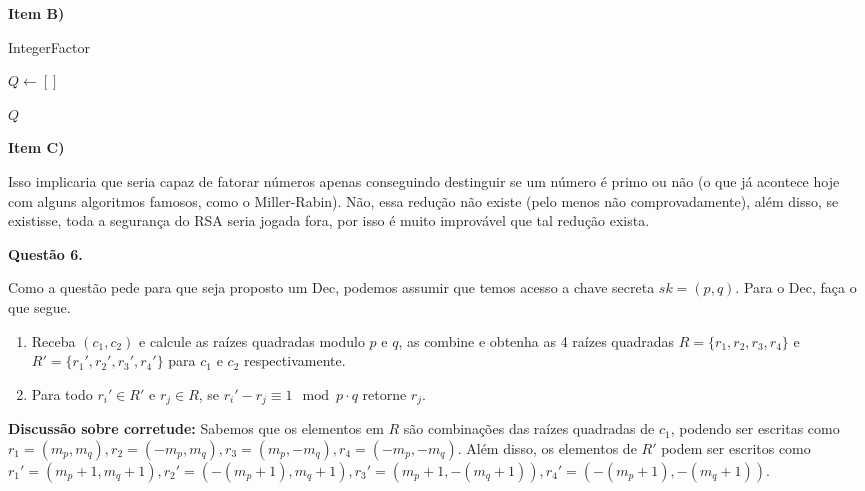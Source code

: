 \documentclass{article}
\begin{document}
\textbf{Item B)}

\begin{algorithm}[H]
\caption{IntegerFactor}

$Q \leftarrow []$

\Return $Q$
\end{algorithm}

\textbf{Item C)}

Isso implicaria que seria capaz de fatorar números apenas conseguindo destinguir se um número é primo ou não (o que já acontece hoje com alguns algoritmos famosos, como o Miller-Rabin). Não, essa redução não existe (pelo menos não comprovadamente), além disso, se existisse, toda a segurança do RSA seria jogada fora, por isso é muito improvável que tal redução exista.

\textbf{Questão 6.}

Como a questão pede para que seja proposto um Dec, podemos assumir que temos acesso a chave secreta $sk =(p,q)$. Para o Dec, faça o que segue.

\begin{enumerate}
        \item Receba $(c_1,c_2)$ e calcule as raízes quadradas modulo $p$ e $q$, as combine e obtenha as 4 raízes quadradas $R = \{r_1, r_2, r_3, r_4\}$ e $R'=\{r_1', r_2', r_3', r_4'\}$ para $c_1$ e $c_2$ respectivamente.
        \item Para todo $r_i' \in R'$ e $r_j \in R$, se $r_i' - r_j \equiv 1 \mod p \cdot q$ retorne $r_j$.
\end{enumerate}

\textbf{Discussão sobre corretude:} Sabemos que os elementos em $R$ são combinações das raízes quadradas de $c_1$, podendo ser escritas como $r_1 = (m_p, m_q), r_2 =(-m_p, m_q), r_3 = (m_p, -m_q), r_4=(-m_p,-m_q)$. Além disso, os elementos de $R'$ podem ser escritos como $r_1' = (m_p + 1, m_q + 1), r_2' =(-(m_p + 1), m_q + 1), r_3' = (m_p+1, -(m_q+1)), r_4'=(-(m_p+1),-(m_q+1))$.
\end{document}
